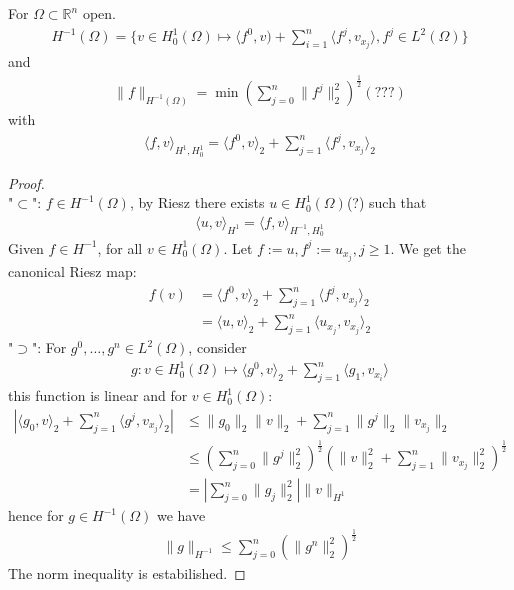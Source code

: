 \begin{theorem}
	For $\Omega \subset \mathbb{R}^n$ open. 
	\begin{align*}
		H^{-1}(\Omega) = \bigg\{ v \in H^1_0(\Omega) \mapsto \langle f^0, v) + \sum_{i = 1}^n \langle f^j, v_{x_j} \rangle, f^j \in L^2(\Omega) \bigg\}
	\end{align*}
	and 
	\begin{align*}
		\|f\|_{H^{-1}(\Omega)} = \min (\sum_{j = 0}^n \|f^j\|^2_2 )^{\frac{1}{2}}(???)
	\end{align*}
	with
	\begin{align*}
		\langle f, v \rangle_{H^1, H^1_0} = \langle f^0, v\rangle_2 +  \sum_{j = 1}^n \langle f^j, v_{x_j} \rangle_2
	\end{align*}
\end{theorem}
\begin{proof}
	\quad\\
	"$\subset$": $f \in H^{-1}(\Omega)$, by Riesz there exists $u \in H^1_0(\Omega)$(?) such that
	\begin{align*}
		\langle u, v \rangle_{H^1} = \langle f, v \rangle_{H^{-1}, H^1_0}
	\end{align*}
	Given $f \in H^{-1}$, for all $v \in H^1_0(\Omega)$. Let $f:= u, f^j:= u_{x_j}, j \geq 1$. We get the canonical Riesz map:
	\begin{align*}
		f(v) &= 
		\langle f^0, v \rangle_2 + \sum_{j = 1}^n \langle f^j, v_{x_j} \rangle_2 \\ 
		& =\langle u, v \rangle_2 + \sum_{j = 1}^n \langle u_{x_j}, v_{x_j} \rangle_2 
	\end{align*}
	"$\supset$": For $g^0, \dots, g^n \in L^2(\Omega)$, consider 
	\begin{align*}
		g: v \in H^1_0(\Omega) \mapsto \langle g^0, v \rangle_2 + \sum_{j = 1}^n \langle g_1, v_{x_i}\rangle
	\end{align*}
	this function is linear and for $v \in H^1_0(\Omega)$:
	\begin{align*}
		|\langle g_0, v \rangle_2 + \sum_{j = 1}^n \langle g^j, v_{x_j} \rangle_2 | &\le \|g_0\|_2\|v\|_2 + \sum_{j = 1}^n \|g^j\|_2\|v_{x_j}\|_2\\
		&\le (\sum_{j = 0}^n \|g^j\|^2_2)^{\frac{1}{2}} (\|v\|_2^2 + \sum_{j = 1}^n \|v_{x_j}\|_2^2)^\frac{1}{2}\\
		&= |\sum_{j = 0}^n \|g_j\|_2^2| \|v\|_{H^1}
	\end{align*}
	hence for $g \in H^{-1}(\Omega)$ we have 
	\begin{align*}
		\|g\|_{H^{-1}} \le \sum_{j = 0}^n (\| g^n\|_2^2)^{\frac{1}{2}}
	\end{align*}
	The norm inequality is estabilished. 
\end{proof}

